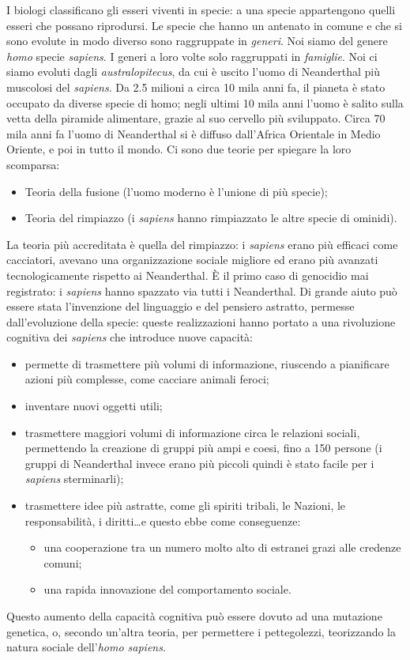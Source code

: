 \documentclass[a4page, 11pt]{article}
\begin{document}
I biologi classificano gli esseri viventi in specie: a una specie appartengono quelli esseri che possano riprodursi.
Le specie che hanno un antenato in comune e che si sono evolute in modo diverso sono raggruppate in \textit{generi}.
Noi siamo del genere \textit{homo} specie \textit{sapiens}.
I generi a loro volte solo raggruppati in \textit{famiglie}.
Noi ci siamo evoluti dagli \textit{australopitecus}, da cui è uscito l'uomo di Neanderthal più muscolosi del \textit{sapiens}.
Da 2.5 milioni a circa 10 mila anni fa, il pianeta è stato occupato da diverse specie di homo; negli ultimi 10 mila anni l'uomo è salito sulla vetta della piramide alimentare, grazie al suo cervello più sviluppato.
Circa 70 mila anni fa l'uomo di Neanderthal si è diffuso dall'Africa Orientale in Medio Oriente, e poi in tutto il mondo.
Ci sono due teorie per spiegare la loro scomparsa:
\begin{itemize}
  \item Teoria della fusione (l'uomo moderno è l'unione di più specie);
  \item	Teoria del rimpiazzo (i \textit{sapiens} hanno rimpiazzato le altre specie di ominidi).
\end{itemize}
La teoria più accreditata è quella del rimpiazzo: i \textit{sapiens} erano più efficaci come cacciatori, avevano una organizzazione sociale migliore ed erano più avanzati tecnologicamente rispetto ai Neanderthal.
È il primo caso di genocidio mai registrato: i \textit{sapiens} hanno spazzato via tutti i Neanderthal.
Di grande aiuto può essere stata l'invenzione del linguaggio e del pensiero astratto, permesse dall'evoluzione della specie: queste realizzazioni hanno portato a una rivoluzione cognitiva dei \textit{sapiens} che introduce nuove capacità:
\begin{itemize}
  \item permette di trasmettere più volumi di informazione, riuscendo a pianificare azioni più complesse, come cacciare animali feroci;
  \item inventare nuovi oggetti utili;
  \item trasmettere maggiori volumi di informazione circa le relazioni sociali, permettendo la creazione di gruppi più ampi e coesi, fino a 150 persone (i gruppi di Neanderthal invece erano più piccoli quindi è stato facile per i \textit{sapiens} sterminarli);
  \item trasmettere idee più astratte, come gli spiriti tribali, le Nazioni, le responsabilità, i diritti\ldots e questo ebbe come conseguenze:
  \begin{itemize}
    \item una cooperazione tra un numero molto alto di estranei grazi alle credenze comuni;
    \item una rapida innovazione del comportamento sociale.
  \end{itemize}
\end{itemize}
Questo aumento della capacità cognitiva può essere dovuto ad una mutazione genetica, o, secondo un'altra teoria, per permettere i pettegolezzi, teorizzando la natura sociale dell'\textit{homo sapiens}.
\end{document}
